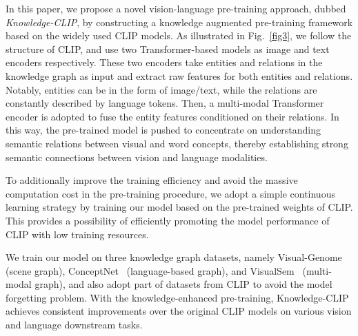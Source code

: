 In this paper, we propose a novel vision-language pre-training approach, dubbed \textit{Knowledge-CLIP}, by constructing a knowledge augmented pre-training framework based on the widely used CLIP models. As illustrated in Fig.~\ref{fig3}, we follow the structure of CLIP, and use two Transformer-based models as image and text encoders respectively. These two encoders take entities and relations in the knowledge graph as input and extract raw features for both entities and relations. Notably, entities can be in the form of image/text, while the relations are constantly described by language tokens. Then, a multi-modal Transformer encoder is adopted to fuse the entity features conditioned on their relations. In this way, the pre-trained model is pushed to concentrate on understanding semantic relations between visual and word concepts, thereby establishing strong semantic connections between vision and language modalities. 

To additionally improve the training efficiency and avoid the massive computation cost in the pre-training procedure, we adopt a simple continuous learning strategy by training our model based on the pre-trained weights of CLIP. This provides a possibility of efficiently promoting the model performance of CLIP with low training resources. 

We train our model on three knowledge graph datasets, namely Visual-Genome~\cite{vgdata} (scene graph), ConceptNet~\cite{conceptnet} (language-based graph), and VisualSem~\cite{visualsem} (multi-modal graph), and also adopt part of datasets from CLIP to avoid the model forgetting problem. With the knowledge-enhanced pre-training, Knowledge-CLIP achieves consistent improvements over the original CLIP models on various vision and language downstream tasks. 
